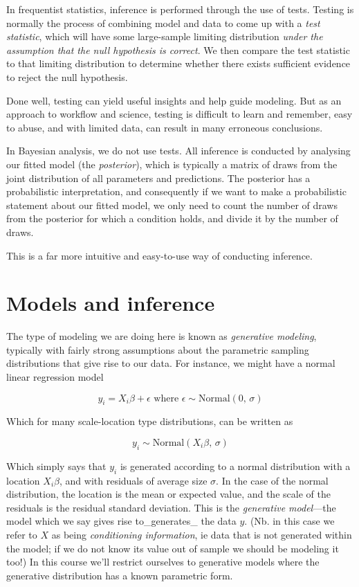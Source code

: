 \documentclass[]{book}
\begin{document}
In frequentist statistics, inference is performed through the use of
tests. Testing is normally the process of combining model and data to
come up with a \emph{test statistic}, which will have some large-sample
limiting distribution \emph{under the assumption that the null
hypothesis is correct}. We then compare the test statistic to that
limiting distribution to determine whether there exists sufficient
evidence to reject the null hypothesis.

Done well, testing can yield useful insights and help guide modeling.
But as an approach to workflow and science, testing is difficult to
learn and remember, easy to abuse, and with limited data, can result in
many erroneous conclusions.

In Bayesian analysis, we do not use tests. All inference is conducted by
analysing our fitted model (the \emph{posterior}), which is typically a
matrix of draws from the joint distribution of all parameters and
predictions. The posterior has a probabilistic interpretation, and
consequently if we want to make a probabilistic statement about our
fitted model, we only need to count the number of draws from the
posterior for which a condition holds, and divide it by the number of
draws.

This is a far more intuitive and easy-to-use way of conducting
inference.

\section{Models and inference}\label{models-and-inference}

The type of modeling we are doing here is known as \emph{generative
modeling}, typically with fairly strong assumptions about the parametric
sampling distributions that give rise to our data. For instance, we
might have a normal linear regression model

\[
y_{i} = X_{i}\beta + \epsilon\mbox{ where } \epsilon \sim \mbox{Normal}(0,\, \sigma)
\]

Which for many scale-location type distributions, can be written as

\[
y_{i}  \sim \mbox{Normal}(X_{i}\beta ,\, \sigma)
\]

Which simply says that \(y_{i}\) is generated according to a normal
distribution with a location \(X_{i}\beta\), and with residuals of
average size \(\sigma\). In the case of the normal distribution, the
location is the mean or expected value, and the scale of the residuals
is the residual standard deviation. This is the \emph{generative
model}---the model which we say gives rise to\_generates\_ the data
\(y\). (Nb. in this case we refer to \(X\) as being \emph{conditioning
information}, ie data that is not generated within the model; if we do
not know its value out of sample we should be modeling it too!) In this
course we'll restrict ourselves to generative models where the
generative distribution has a known parametric form.
\end{document}
